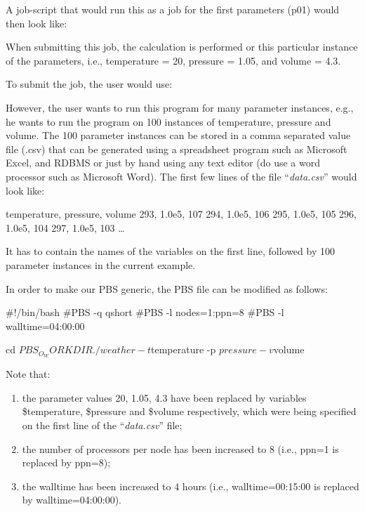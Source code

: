 \begin{description}
A job-script that would run this as a job for the first parameters (p01) would
then look like:


When submitting this job, the calculation is performed or this particular
instance of the parameters, i.e., temperature = 20, pressure = 1.05, and volume
= 4.3.

To submit the job, the user would use:
\begin{prompt}
\end{prompt}

However, the user wants to run this program for many parameter instances, e.g.,
he wants to run the program on 100 instances of temperature, pressure and
volume.  The 100 parameter instances can be stored in a comma separated value
file (.csv) that can be generated using a spreadsheet program such as Microsoft
Excel, and RDBMS or just by hand using any text editor (do  use a
word processor such as Microsoft Word). The first few lines of the file
``\emph{data.csv}'' would look like:

\begin{prompt}
temperature, pressure, volume
293, 1.0e5, 107
294, 1.0e5, 106
295, 1.0e5, 105
296, 1.0e5, 104
297, 1.0e5, 103
\dots
\end{prompt}

It has to contain the names of the variables on the first line, followed by 100
parameter instances in the current example.

In order to make our PBS generic, the PBS file can be modified as follows:

\begin{prompt}
#!/bin/bash
#PBS -q qshort
#PBS -l nodes=1:ppn=8
#PBS -l walltime=04:00:00

cd $PBS_O_WORKDIR
./weather -t $temperature -p $pressure -v $volume
\end{prompt}

Note that:

\begin{enumerate}

  \item  the parameter values 20, 1.05, 4.3 have been replaced by variables
    \$temperature, \$pressure and \$volume respectively, which were being specified
    on the first line of the ``\emph{data.csv}'' file;
  \item  the number of processors per node has been increased to 8 (i.e., ppn=1 is replaced by
    ppn=8);
  \item  the walltime has been increased to 4 hours (i.e.,
    walltime=00:15:00 is replaced by walltime=04:00:00).
\end{enumerate}


\end{description}
